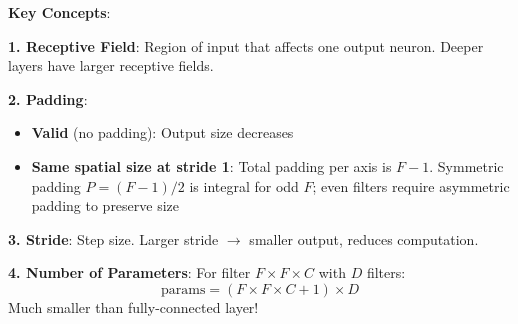 \documentclass[11pt,twoside]{article}
\numberwithin{equation}{section}
\theoremstyle{plain}
\theoremstyle{definition}
\theoremstyle{remark}
\newenvironment{keyidea}{
  \begin{tcolorbox}[colback=yellow!5!white,
                    colframe=yellow!50!black,
                    title=Key Idea,
                    breakable,
                    enhanced,
                    sharp corners,
                    boxrule=0.8pt,
                    left=6pt, right=6pt, top=6pt, bottom=6pt]
}{
  \end{tcolorbox}
}
\begin{document}
\begin{keyidea}
\textbf{Key Concepts}:

\textbf{1. Receptive Field}: Region of input that affects one output neuron. Deeper layers have larger receptive fields.

\textbf{2. Padding}:
\begin{itemize}
\item \textbf{Valid} (no padding): Output size decreases
\item \textbf{Same spatial size at stride 1}: Total padding per axis is $F-1$. Symmetric padding $P=(F-1)/2$ is integral for odd $F$; even filters require asymmetric padding to preserve size
\end{itemize}

\textbf{3. Stride}: Step size. Larger stride $\to$ smaller output, reduces computation.

\textbf{4. Number of Parameters}: For filter $F \times F \times C$ with $D$ filters:
\[
\text{params} = (F \times F \times C + 1) \times D
\]
Much smaller than fully-connected layer!
\end{keyidea}
\end{document}
